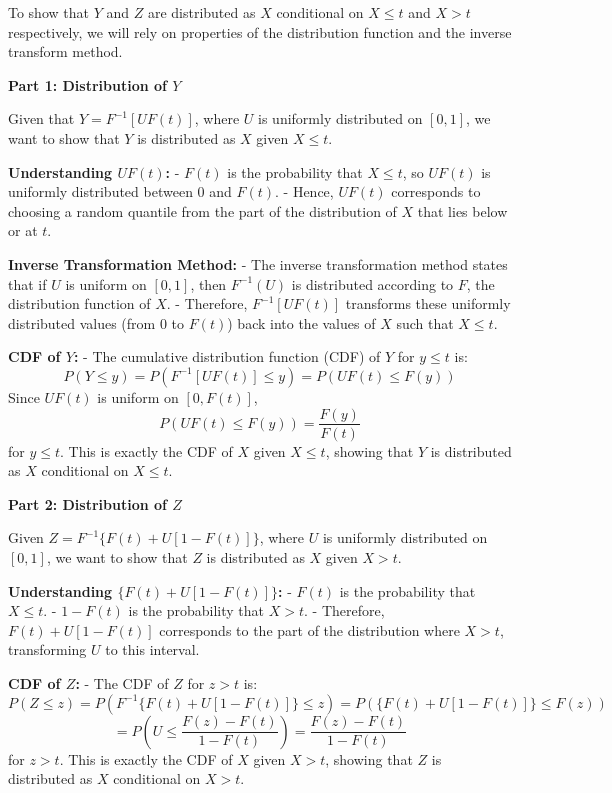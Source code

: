 \documentclass[8pt]{article}
\begin{document}
To show that \(Y\) and \(Z\) are distributed as \(X\) conditional on \(X \leq t\) and \(X > t\) respectively, we will rely on properties of the distribution function and the inverse transform method.

\textbf{Part 1: Distribution of \(Y\)}

Given that \(Y = F^{-1}[UF(t)]\), where \(U\) is uniformly distributed on \([0, 1]\), we want to show that \(Y\) is distributed as \(X\) given \(X \leq t\).

\textbf{Understanding \(UF(t)\):}
- \(F(t)\) is the probability that \(X \leq t\), so \(UF(t)\) is uniformly distributed between 0 and \(F(t)\).
- Hence, \(UF(t)\) corresponds to choosing a random quantile from the part of the distribution of \(X\) that lies below or at \(t\).

\textbf{Inverse Transformation Method:}
- The inverse transformation method states that if \(U\) is uniform on \([0, 1]\), then \(F^{-1}(U)\) is distributed according to \(F\), the distribution function of \(X\).
- Therefore, \(F^{-1}[UF(t)]\) transforms these uniformly distributed values (from 0 to \(F(t)\)) back into the values of \(X\) such that \(X \leq t\). 

\textbf{CDF of \(Y\):}
- The cumulative distribution function (CDF) of \(Y\) for \(y \leq t\) is:
  \[
  P(Y \leq y) = P(F^{-1}[UF(t)] \leq y) = P(UF(t) \leq F(y))
  \]
  Since \(UF(t)\) is uniform on \([0, F(t)]\),
  \[
  P(UF(t) \leq F(y)) = \frac{F(y)}{F(t)}
  \]
  for \(y \leq t\). This is exactly the CDF of \(X\) given \(X \leq t\), showing that \(Y\) is distributed as \(X\) conditional on \(X \leq t\).

\textbf{Part 2: Distribution of \(Z\)}

Given \(Z = F^{-1}\{F(t) + U[1 - F(t)]\}\), where \(U\) is uniformly distributed on \([0, 1]\), we want to show that \(Z\) is distributed as \(X\) given \(X > t\).

\textbf{Understanding \(\{F(t) + U[1 - F(t)]\}\):}
- \(F(t)\) is the probability that \(X \leq t\).
- \(1 - F(t)\) is the probability that \(X > t\).
- Therefore, \(F(t) + U[1 - F(t)]\) corresponds to the part of the distribution where \(X > t\), transforming \(U\) to this interval.

\textbf{CDF of \(Z\):}
- The CDF of \(Z\) for \(z > t\) is:
  \[
  P(Z \leq z) = P(F^{-1}\{F(t) + U[1 - F(t)]\} \leq z) = P(\{F(t) + U[1 - F(t)]\} \leq F(z))
  \]
  \[
  = P(U \leq \frac{F(z) - F(t)}{1 - F(t)}) = \frac{F(z) - F(t)}{1 - F(t)}
  \]
  for \(z > t\). This is exactly the CDF of \(X\) given \(X > t\), showing that \(Z\) is distributed as \(X\) conditional on \(X > t\).
\end{document}
